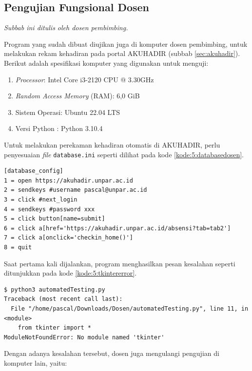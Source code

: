 \subsection{Pengujian Fungsional Dosen}

\textit{Subbab ini ditulis oleh dosen pembimbing.}

Program yang sudah dibuat diujikan juga di komputer dosen pembimbing, untuk melakukan rekam kehadiran pada portal AKUHADIR (subbab \ref{sec:akuhadir}). Berikut adalah spesifikasi komputer yang digunakan untuk menguji:

\begin{enumerate}
	\item \textit{Processor}: Intel Core i3-2120 CPU @ 3.30GHz 
	\item \textit{Random Access Memory} (RAM): 6,0 GiB
	\item Sistem Operasi: Ubuntu 22.04 LTS
	\item Versi Python : Python 3.10.4
\end{enumerate}

Untuk melakukan perekaman kehadiran otomatis di AKUHADIR, perlu penyesuaian \textit{file} \texttt{database.ini} seperti dilihat pada kode \ref{kode:5:databasedosen}.

\begin{lstlisting}[caption=\textit{File} \texttt{database.ini} AKUHADIR (\textit{password} disembunyikan), label=kode:5:databasedosen]
[database_config]
1 = open https://akuhadir.unpar.ac.id
2 = sendkeys #username pascal@unpar.ac.id
3 = click #next_login
4 = sendkeys #password xxx
5 = click button[name=submit]
6 = click a[href='https://akuhadir.unpar.ac.id/absensi?tab=tab2']
7 = click a[onclick='checkin_home()']
8 = quit
\end{lstlisting}

Saat pertama kali dijalankan, program menghasilkan pesan kesalahan seperti ditunjukkan pada kode \ref{kode:5:tkintererror}.

\begin{lstlisting}[caption=Pesan kesalahan skrip tanpa \textit{tkinter}), label=kode:5:tkintererror]
$ python3 automatedTesting.py 
Traceback (most recent call last):
  File "/home/pascal/Downloads/Dosen/automatedTesting.py", line 11, in <module>
    from tkinter import * 
ModuleNotFoundError: No module named 'tkinter'
\end{lstlisting}

Dengan adanya kesalahan tersebut, dosen juga mengulangi pengujian di komputer lain, yaitu:

